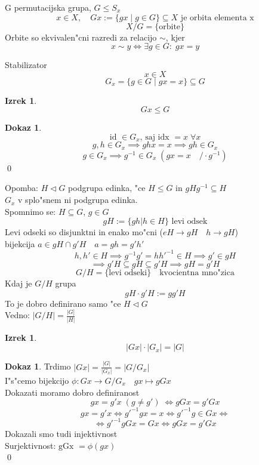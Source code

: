 \documentclass[a4paper,12pt]{article}
\theoremstyle{definition}
\newtheorem{theorem}[counter]{Izrek}
\newtheorem{pro}[counter]{Dokaz} %
\theoremstyle{remark}
\begin{document}
G permutacijska grupa, $G \leq S_x$ \\
\[x \in X, \quad Gx := \{gx \; \vert \; g \in G\} \subseteq X \text{ je orbita elementa x}\]
\[X/G = \{\text{orbite}\}\]
Orbite so ekvivalen"cni razredi za relacijo $\sim$, kjer \\
\[x \sim y \iff \exists g \in G: \; gx = y\]

Stabilizator \\
\[x \in X\]
\[G_x = \{g \in G \; \vert \; gx = x\} \subseteq G\]

\begin{theorem}
    \[Gx \leq G\]    
\end{theorem}

\begin{pro}
    \[\text{id } \in G_x \text{, saj  idx } = x \; \forall x\]
    \[g,h \in G_x \implies ghx = x \implies gh \in G_x\]
    \[g \in G_x \implies g^{-1} \in G_x \; (gx = x \quad / \cdot g^{-1})\]
    \qed
\end{pro}

Opomba: $H \triangleleft G$ podgrupa edinka, "ce $H \leq G$ in $gHg^{-1} \subseteq H$ \\
$G_x$ v splo"snem ni podgrupa edinka. \\
Spomnimo se: $H \subseteq G$, $g \in G$\\
\[gH := \{gh \vert h \in H\} \text{ levi odsek}\]
Levi odseki so disjunktni in enako mo"cni ($eH \to gH \quad h \to gH$) \\
bijekcija $a \in gH \cap g'H \quad a=gh=g'h'$ \\
\[h,h' \in H \implies g^{-1}g' = hh'^{-1} \in H \implies g' \in gH\]
\[\implies g'H \subseteq gH \subseteq g'H \implies gH = g'H\]
\[G/H = \{\text{levi odseki}\} \quad \text{kvocientna mno"zica}\]
Kdaj je $G/H$ grupa
\[gH \cdot g'H := gg'H\]
To je dobro definirano samo "ce $H \triangleleft G$ \\
Vedno: $|G/H| = \frac{|G]}{|H|}$ \\

\begin{theorem}
    \[|Gx| \cdot |G_x| = |G|\]
\end{theorem}

\begin{pro}
    Trdimo $|Gx| = \frac{|G|}{|G_x|} = |G/G_x|$ \\
    I"s"cemo bijekcijo $\phi: Gx \to G/G_x \quad gx \mapsto gGx$ \\
    Dokazati moramo dobro definiranost
    \[gx = g'x \; (g \neq g') \; \iff gGx = g'Gx\]
    \[gx = g'x \iff g'^{-1}gx = x \iff g'^{-1}g \in Gx \iff \]
    \[\iff g'^{-1}gGx = Gx \iff gGx = g'Gx\]
    Dokazali smo tudi injektivnost \\
    Surjektivnost: $\text{gGx } = \phi(gx)$\\
    \qed
\end{pro}
\end{document}

